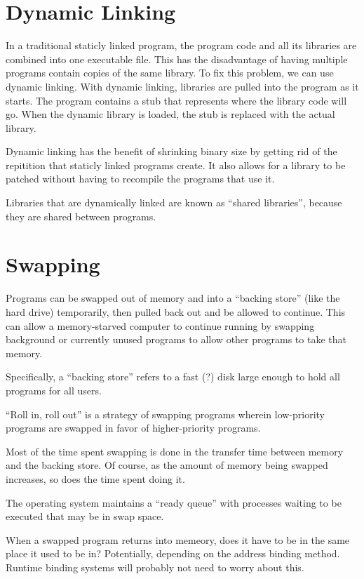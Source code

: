 \documentclass{article}
\begin{document}
\section{Dynamic Linking}
In a traditional staticly linked program, the program code and all its
libraries are combined into one executable file. This has the disadvantage of
having multiple programs contain copies of the same library. To fix this
problem, we can use dynamic linking. With dynamic linking, libraries are pulled
into the program as it starts. The program contains a stub that represents
where the library code will go. When the dynamic library is loaded, the stub is
replaced with the actual library.

Dynamic linking has the benefit of shrinking binary size by getting rid of the
repitition that staticly linked programs create. It also allows for a library
to be patched without having to recompile the programs that use it.

Libraries that are dynamically linked are known as ``shared libraries'',
because they are shared between programs.

\section{Swapping}
Programs can be swapped out of memory and into a ``backing store'' (like the
hard drive) temporarily, then pulled back out and be allowed to continue. This
can allow a memory-starved computer to continue running by swapping background
or currently unused programs to allow other programs to take that memory.

Specifically, a ``backing store'' refers to a fast (?) disk large enough to
hold all programs for all users.

``Roll in, roll out'' is a strategy of swapping programs wherein low-priority
programs are swapped in favor of higher-priority programs.

Most of the time spent swapping is done in the transfer time between memory and
the backing store. Of course, as the amount of memory being swapped increases,
so does the time spent doing it.

The operating system maintains a ``ready queue'' with processes waiting to be
executed that may be in swap space.

When a swapped program returns into memeory, does it have to be in the same
place it used to be in? Potentially, depending on the address binding method.
Runtime binding systems will probably not need to worry about this.
\end{document}
